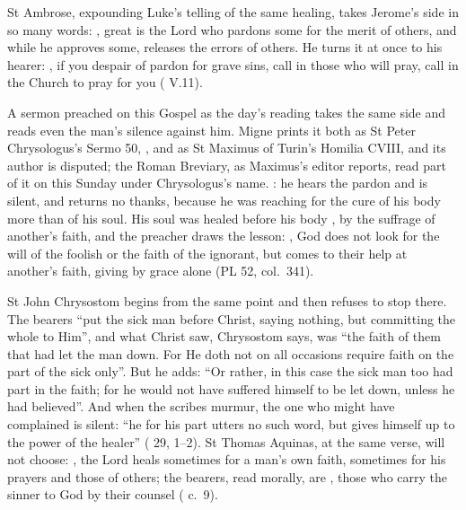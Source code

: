 St Ambrose, expounding Luke's telling of the same healing, takes Jerome's side
in so many words: , great is the Lord who pardons some for
the merit of others, and while he approves some, releases the errors of
others. He turns it at once to his hearer: , if
you despair of pardon for grave sins, call in those who will pray, call in the
Church to pray for you ( V.11).

A sermon preached on this Gospel as the day's reading takes the same side and
reads even the man's silence against him. Migne prints it both as St Peter
Chrysologus's Sermo 50, , and as St Maximus of
Turin's Homilia CVIII, and its author is disputed; the Roman Breviary, as Maximus's
editor reports, read part of it on this Sunday under Chrysologus's name. : he hears the pardon and is silent, and returns
no thanks, because he was reaching for the cure of his body more than of his
soul. His soul was healed before his body , by
the suffrage of another's faith, and the preacher draws the lesson:
, God does not look for the will of the foolish or the faith of the
ignorant, but comes to their help at another's faith, giving by grace alone
(PL 52, col.~341).

St John Chrysostom begins from the same point and then refuses to stop there.
The bearers ``put the sick man before Christ, saying nothing, but committing the
whole to Him'', and what Christ saw, Chrysostom says, was ``the faith of them
that had let the man down. For He doth not on all occasions require faith on
the part of the sick only''. But he adds: ``Or rather, in this case the sick
man too had part in the faith; for he would not have suffered himself to be let
down, unless he had believed''. And when the scribes murmur, the one who might
have complained is silent: ``he for his part utters no such word, but gives
himself up to the power of the healer'' ( 29, 1--2).
St Thomas Aquinas, at the same verse, will not choose: ,
the Lord heals sometimes for a man's own faith, sometimes for his prayers and
those of others; the bearers, read morally, are , those who carry the sinner to God by their
counsel ( c.~9).

